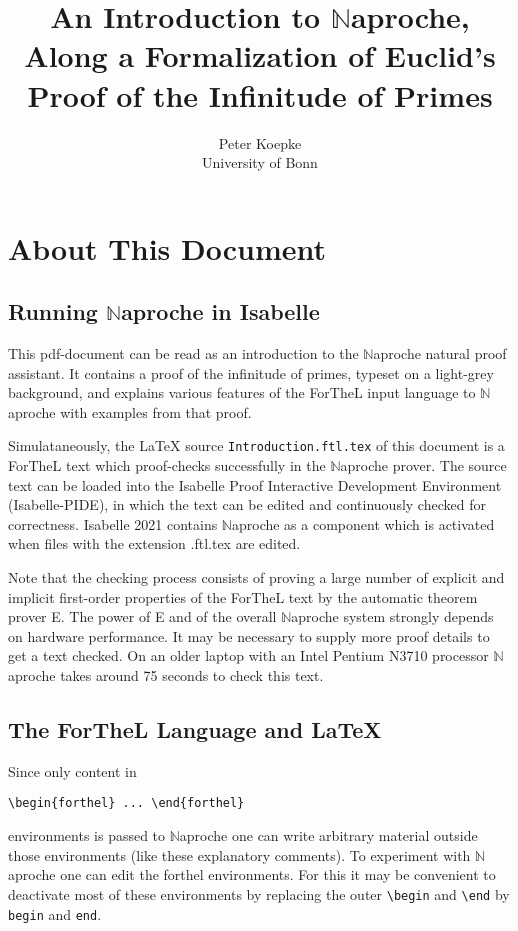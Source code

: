 \documentclass[11pt]{article}
\author{Peter Koepke\\University of Bonn}
\title{\textbf{An Introduction to $\mathbb{N}$aproche, 
Along a Formalization of Euclid's Proof 
of the Infinitude of Primes}}
\begin{document}
\newcommand{\val}[2]{#1_{#2}}
\newcommand{\Prod}[3]{#1_{#2} \cdots #1_{#3}}
\newcommand{\Seq}[2]{\{#1,\dots,#2\}}
\newcommand{\Set}[3]{\{#1_{#2},\dots,#1_{#3}\}}
\newcommand{\Primes}{\mathbb{P}}
\newcommand{\Naproche}{$\mathbb{N}$aproche}

\maketitle

\section{About This Document}
\subsection{Running \Naproche{} in Isabelle}
This pdf-document can be read as an introduction to the \Naproche{} natural
proof assistant. It contains a proof of the infinitude of primes, typeset on a 
light-grey background, and explains various features of the ForTheL input
language to \Naproche{} with examples from that proof.

Simulataneously, the \LaTeX{} source \verb+Introduction.ftl.tex+ of this document 
is a ForTheL text which proof-checks successfully in the \Naproche{} prover.
The source text can be loaded into the Isabelle Proof Interactive 
Development Environment (Isabelle-PIDE), in which the text can be edited
and continuously checked for correctness. Isabelle 2021 contains \Naproche{} as
a component which is activated when files with the extension .ftl.tex are edited.

Note that the checking process consists of proving a large number of explicit 
and implicit first-order properties of the ForTheL text by the automatic 
theorem prover E. The power of E and of the overall \Naproche{} system
strongly depends on hardware performance. It may be necessary to supply
more proof details to get a text checked. On an older laptop 
with an Intel Pentium N3710 processor \Naproche{} takes 
around 75 seconds to check this text.

\subsection{The ForTheL Language and \LaTeX}
Since only content in

\verb_\_\verb_begin{forthel} ... _\verb_\_\verb_end{forthel}_ 

\noindent environments is passed to \Naproche{} one can write arbitrary material
outside those environments (like these explanatory comments). To experiment with
\Naproche{} one can edit the forthel environments. For this it may be convenient to
deactivate most of these environments by replacing the outer 
\verb_\_\verb_begin_ and \verb_\_\verb_end_ by
\verb_begin_ and \verb_end_.
\end{document}
